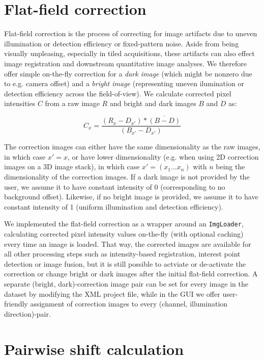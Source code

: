 \section{Flat-field correction}
\label{sec:flatfield}

Flat-field correction is the process of correcting for image artifacts due to uneven illumination or detection efficiency or fixed-pattern noise. Aside from being visually unpleasing, especially in tiled acquisitions, these artifacts can also effect image registration and downstream quantitative image analyses. We therefore offer simple on-the-fly correction for a \emph{dark image} (which might be nonzero due to e.g. camera offset) and a \emph{bright image} (representing uneven ilumination or detection efficiency across the field-of-view). We calculate corrected pixel intensities $C$ from a raw image $R$ and bright and dark images $B$ and $D$ as:

\begin{equation}
\label{eq:flatfield-eq1}
C_{x} = \frac{(R_{x} - D_{x'}) * \overline{(B-D)} }{(B_{x'}- D_{x'})}
\end{equation}

The correction images can either have the same dimensionality as the raw images, in which case $x' = x$, or have lower dimensionality (e.g. when using 2D correction images on a 3D image stack), in which case $x' = (x_1 \hdots x_n)$ with $n$ being the dimensionality of the correction images. If a dark image is not provided by the user, we assume it to have constant intensity of 0 (corresponding to no background offset). Likewise, if no bright image is provided, we assume it to have constant intensity of 1 (uniform illumination and detection efficiency). 

We implemented the flat-field correction as a wrapper around an \texttt{ImgLoader}, calculating corrected pixel intensity values on-the-fly (with optional caching) every time an image is loaded. That way, the corrected images are available for all other processing steps such as intensity-based registration, interest point detection or image fusion, but it is still possible to actviate or de-activate the correction or change bright or dark images after the initial flat-field correction. A separate (bright, dark)-correction image pair can be set for every image in the dataset by modifying the XML project file, while in the GUI we offer user-friendly assignment of correction images to every (channel, illumination direction)-pair.

\section{Pairwise shift calculation}

